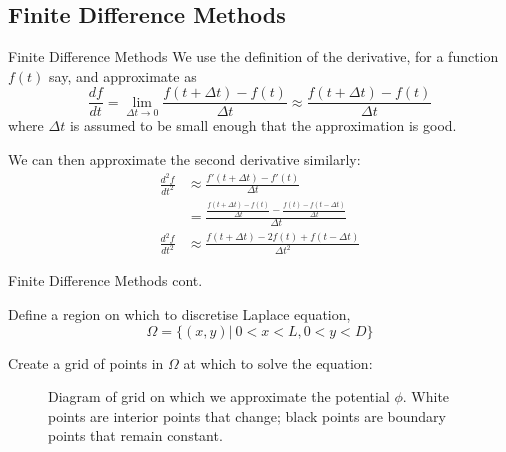 \documentclass{beamer}
\newcommand{\be}{\begin{equation}}
\newcommand{\ee}{\end{equation}}
\begin{document}
\subsection{Finite Difference Methods}

\begin{frame}{Finite Difference Methods}
We use the definition of the derivative, for a function $f(t)$ say, and approximate as
%
\be
\frac{df}{dt} = \lim_{\Delta t\to 0}\frac{f(t+\Delta t) - f(t)}{\Delta t} \approx \frac{f(t+\Delta t) - f(t)}{\Delta t}
\ee
%
where $\Delta t$ is assumed to be small enough that the approximation is good.

We can then approximate the second derivative similarly:
%
\begin{align}
\frac{d^2 f}{dt^2} &\approx \frac{f'(t+\Delta t) - f'(t)}{\Delta t} \\
		   &= \frac{\frac{f(t+\Delta t) - f(t)}{\Delta t} - \frac{f(t) - f(t-\Delta t)}{\Delta t}}{\Delta t} \\
\frac{d^2 f}{dt^2} &\approx  \frac{f(t+\Delta t) - 2f(t) + f(t-\Delta t)}{\Delta t^2}
\end{align}

\end{frame}

\begin{frame}{Finite Difference Methods cont.}

Define a region on which to discretise Laplace equation, 
%
\be
\Omega = \{(x,y)|\:0<x<L,0<y<D\}
\ee

Create a grid of points in $\Omega$ at which to solve the equation:

\begin{figure}
\centering
{}
\caption{Diagram of grid on which we approximate the potential $\phi$. White points
are interior points that change; black points are boundary points that remain constant.}
\end{figure}

\end{frame}
\end{document}
